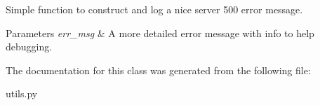 Simple function to construct and log a nice server 500 error message. 


\begin{DoxyParams}{Parameters}
{\em err\+\_\+msg} & A more detailed error message with info to help debugging. \\
\hline
\end{DoxyParams}


The documentation for this class was generated from the following file\+:\begin{DoxyCompactItemize}
\item 
utils.\+py\end{DoxyCompactItemize}
